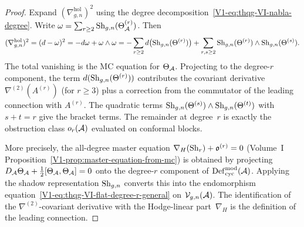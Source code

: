 \begin{proof}
Expand $(\nabla^{\mathrm{hol}}_{g,n})^2$ using the
degree decomposition~\eqref{V1-eq:thqg-VI-nabla-degree}. Write
$\omega = \sum_{r \geq 2} \operatorname{Sh}_{g,n}(\Theta^{(r)}_{\mathcal{A}})$.
Then
\[
(\nabla^{\mathrm{hol}}_{g,n})^2
= (d - \omega)^2
= -d\omega + \omega \wedge \omega
= -\sum_{r \geq 2} d\bigl(\operatorname{Sh}_{g,n}(\Theta^{(r)})\bigr)
 + \sum_{r,s \geq 2}
 \operatorname{Sh}_{g,n}(\Theta^{(r)}) \wedge \operatorname{Sh}_{g,n}(\Theta^{(s)}).
\]
The total vanishing is the MC equation for $\Theta_{\mathcal{A}}$.
Projecting to the degree-$r$ component, the term $d(\operatorname{Sh}_{g,n}(\Theta^{(r)}))$
contributes the covariant derivative $\nabla^{(2)}(A^{(r)})$ (for
$r \geq 3$) plus a correction from the commutator of the leading
connection with $A^{(r)}$. The quadratic terms
$\operatorname{Sh}_{g,n}(\Theta^{(s)}) \wedge \operatorname{Sh}_{g,n}(\Theta^{(t)})$ with
$s + t = r$ give the bracket terms. The remainder at degree~$r$
is exactly the obstruction class $o_r(\mathcal{A})$ evaluated on conformal
blocks.

More precisely, the all-degree master equation
$\nabla_H(\operatorname{Sh}_r) + \mathfrak{o}^{(r)} = 0$
(Volume~I Proposition~\ref{V1-prop:master-equation-from-mc}) is obtained by
projecting $D_{\mathcal{A}}\Theta_{\mathcal{A}} + \tfrac{1}{2}[\Theta_{\mathcal{A}},\Theta_{\mathcal{A}}] = 0$
onto the degree-$r$ component of $\operatorname{Def}_{\mathrm{cyc}}^{\mathrm{mod}}(\mathcal{A})$.
Applying the shadow representation $\operatorname{Sh}_{g,n}$ converts this into
the endomorphism equation~\eqref{V1-eq:thqg-VI-flat-degree-r-general}
on $\mathcal{V}_{g,n}(\mathcal{A})$. The identification of the
$\nabla^{(2)}$-covariant derivative with the Hodge-linear
part~$\nabla_H$ is the definition of the leading connection.
\end{proof}

